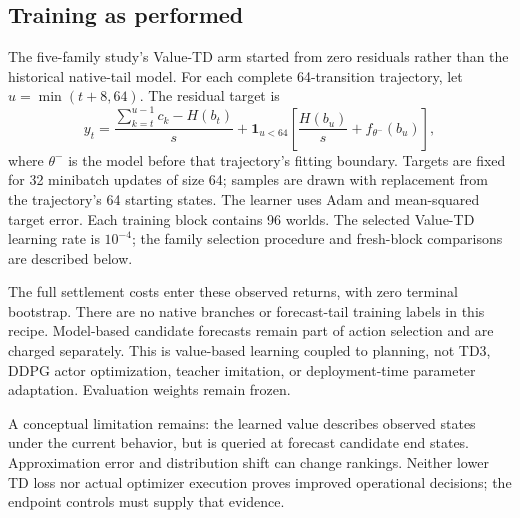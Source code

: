 \documentclass[preprint,review,12pt]{elsarticle}
\begin{document}
\subsection{Training as performed}
The five-family study's Value-TD arm started from zero residuals rather than
the historical native-tail model. For each complete 64-transition trajectory,
let $u=\min(t+8,64)$. The residual target is
\begin{equation}
y_t=
\frac{\sum_{k=t}^{u-1}c_k-H(b_t)}{s}
+\mathbf{1}_{u<64}\left[
\frac{H(b_u)}{s}+f_{\theta^-}(b_u)\right],
\label{eq:current-observed-td}
\end{equation}
where $\theta^-$ is the model before that trajectory's fitting boundary.
Targets are fixed for 32 minibatch updates of size 64; samples are drawn
with replacement from the trajectory's 64 starting states. The learner
uses Adam and mean-squared target error. Each training block contains
96 worlds. The selected Value-TD learning rate is $10^{-4}$; the family
selection procedure and fresh-block comparisons are described below.

The full settlement costs enter these observed returns, with zero terminal
bootstrap. There are no native branches or forecast-tail training labels
in this recipe. Model-based candidate forecasts remain part of action
selection and are charged separately. This is value-based learning coupled
to planning, not TD3, DDPG actor optimization, teacher imitation, or
deployment-time parameter adaptation. Evaluation weights remain frozen.

A conceptual limitation remains: the learned value describes observed
states under the current behavior, but is queried at forecast candidate
end states. Approximation error and distribution shift can change rankings.
Neither lower TD loss nor actual optimizer execution proves improved
operational decisions; the endpoint controls must supply that evidence.
\end{document}
